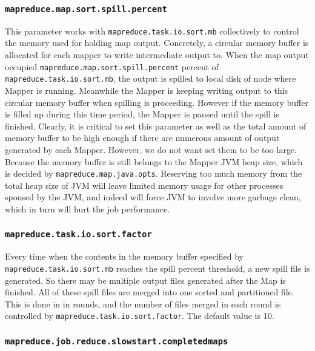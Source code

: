 \subsubsection{\texttt{mapreduce.map.sort.spill.percent}}

This parameter works with \texttt{mapreduce.task.io.sort.mb} collectively to 
control the memory used for holding map output. Concretely, a circular memory 
buffer is allocated for each mapper to write intermediate output to. When the 
map output occupied \texttt{mapreduce.map.sort.spill.percent} percent of \\
\texttt{mapreduce.task.io.sort.mb}, the output is spilled to local disk of node
where Mapper is running. Meanwhile the Mapper is keeping writing output to this
circular memory buffer when spilling is proceeding. However if the memory buffer
is filled up during this time period, the Mapper is paused until the spill is
finished. Clearly, it is critical to set this parameter as well as the total 
amount of memory buffer to be high enough if there are numerous amount of output
generated by each Mapper. However, we do not want set them to be too large.
Because the memory buffer is still belongs to the Mapper JVM heap size, which is
decided by \texttt{mapreduce.map.java.opts}. Reserving too much memory from the
total heap size of JVM will leave limited memory usage for other processes sponsed
by the JVM, and indeed will force JVM to involve more garbage clean, which in 
turn will hurt the job performance.    

\subsubsection{\texttt{mapreduce.task.io.sort.factor}}

Every time when the contents in the memory buffer specified by \\
\texttt{mapreduce.task.io.sort.mb} reaches the spill percent threshold, a new
spill file is generated. So there may be multiple output files generated after 
the Map is finished. All of these spill files are merged into one sorted and
partitioned file. This is done in in rounds, and the number of files merged in 
each round is controlled by \texttt{mapreduce.task.io.sort.factor}. The default 
value is 10.


\subsubsection{\texttt{mapreduce.job.reduce.slowstart.completedmaps}}

